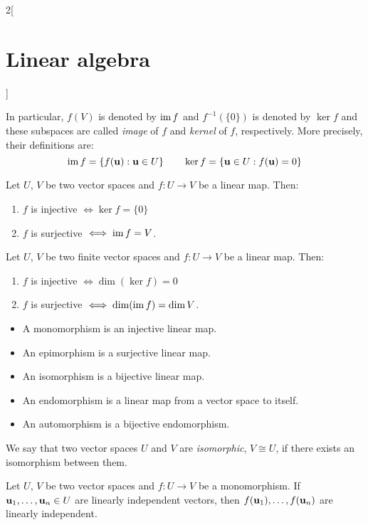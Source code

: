 \documentclass[../../../main_math.tex]{subfiles}
\begin{document}
\begin{multicols}{2}[\section{Linear algebra}]
\begin{proposition}
    In particular, $f(V)$ is denoted by $\operatorname{im} f$ and $f^{-1}(\{0\})$ is denoted by $\ker f$ and these subspaces are called \emph{image} of $f$ and \emph{kernel} of $f$, respectively. More precisely, their definitions are:
    $$\operatorname{im} f=\{f(\boldsymbol{\mathrm{u}}): \boldsymbol{\mathrm{u}}\in U\}\qquad\ker f=\{\boldsymbol{\mathrm{u}}\in U: f(\boldsymbol{\mathrm{u}})=0\}$$
  \end{proposition}
  \begin{proposition}
    Let $U$, $V$ be two vector spaces and $f:U\rightarrow V$ be a linear map. Then:
    \begin{enumerate}
      \item $f$ is injective $\iff\ker f=\{0\}$
      \item $f$ is surjective $\iff\operatorname{im} f=V$.
    \end{enumerate}
  \end{proposition}
  \begin{corollary}
    Let $U$, $V$ be two finite vector spaces and $f:U\rightarrow V$ be a linear map. Then:
    \begin{enumerate}
      \item $f$ is injective $\iff\dim(\ker f)=0$
      \item $f$ is surjective $\iff\dim(\operatorname{im} f)=\dim V$.
    \end{enumerate}
  \end{corollary}
  \begin{definition}
    \hfill
    \begin{itemize}
      \item A monomorphism is an injective linear map.
      \item An epimorphism is a surjective linear map.
      \item An isomorphism is a bijective linear map.
      \item An endomorphism is a linear map from a vector space to itself.
      \item An automorphism is a bijective endomorphism.
    \end{itemize}
  \end{definition}
  \begin{definition}
    We say that two vector spaces $U$ and $V$ are \emph{isomorphic}, $V\cong U$, if there exists an isomorphism between them.
  \end{definition}
  \begin{proposition}
    Let $U$, $V$ be two vector spaces and $f:U\rightarrow V$ be a monomorphism. If $\boldsymbol{\mathrm{u}}_1,\ldots,\boldsymbol{\mathrm{u}}_n\in U$ are linearly independent vectors, then $f(\boldsymbol{\mathrm{u}}_1),\ldots,f(\boldsymbol{\mathrm{u}}_n)$  are linearly independent.

\end{proposition}
\end{multicols}
\end{document}
